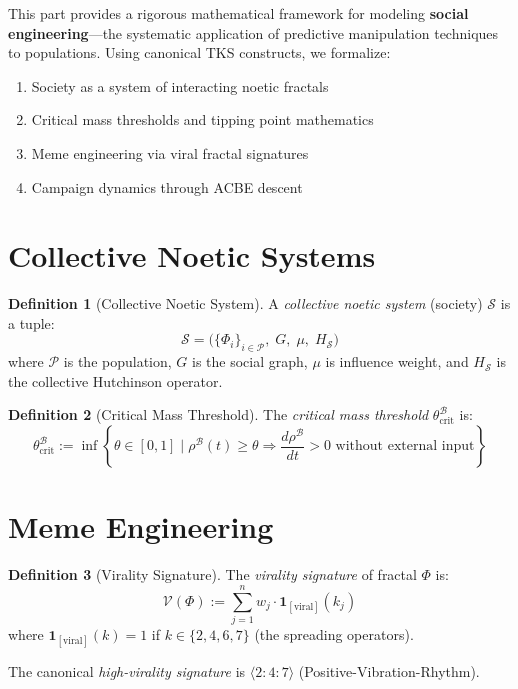\documentclass[11pt,twoside]{book}
\newcommand{\Frac}{\Phi}
\theoremstyle{definition}
\newtheorem{definition}{Definition}[chapter]
\theoremstyle{plain}
\theoremstyle{remark}
\begin{document}
\begin{tcolorbox}[colback=blue!5!white,colframe=blue!75!black,title=\textbf{Chapter Overview},breakable]
This part provides a rigorous mathematical framework for modeling \textbf{social engineering}---the systematic application of predictive manipulation techniques to populations. Using canonical TKS constructs, we formalize:
\begin{enumerate}
    \item Society as a system of interacting noetic fractals
    \item Critical mass thresholds and tipping point mathematics
    \item Meme engineering via viral fractal signatures
    \item Campaign dynamics through ACBE descent
\end{enumerate}
\end{tcolorbox}

\section{Collective Noetic Systems}

\begin{definition}[Collective Noetic System]
A \emph{collective noetic system} (society) $\mathcal{S}$ is a tuple:
\[
    \mathcal{S} = \bigl( \{\Frac_i\}_{i \in \mathcal{P}}, \; G, \; \mu, \; H_{\mathcal{S}} \bigr)
\]
where $\mathcal{P}$ is the population, $G$ is the social graph, $\mu$ is influence weight, and $H_{\mathcal{S}}$ is the collective Hutchinson operator.
\end{definition}

\begin{definition}[Critical Mass Threshold]
The \emph{critical mass threshold} $\theta_{\mathrm{crit}}^{\mathcal{B}}$ is:
\begin{equation}
\boxed{
    \theta_{\mathrm{crit}}^{\mathcal{B}} := \inf \left\{ \theta \in [0,1] \;\Big|\;
    \rho^{\mathcal{B}}(t) \geq \theta \Rightarrow
    \frac{d\rho^{\mathcal{B}}}{dt} > 0 \text{ without external input} \right\}
}
\end{equation}
\end{definition}

\section{Meme Engineering}

\begin{definition}[Virality Signature]
The \emph{virality signature} of fractal $\Frac$ is:
\[
    \mathcal{V}(\Frac) := \sum_{j=1}^{n} w_j \cdot \mathbf{1}_{[\text{viral}]}(k_j)
\]
where $\mathbf{1}_{[\text{viral}]}(k) = 1$ if $k \in \{2, 4, 6, 7\}$ (the spreading operators).

The canonical \emph{high-virality signature} is $\langle 2:4:7 \rangle$ (Positive-Vibration-Rhythm).
\end{definition}
\end{document}

